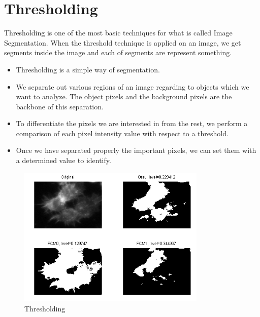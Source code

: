 \section{Thresholding}
Thresholding is one of the most basic techniques for what is called Image Segmentation. When the threshold technique is applied on an image, we get segments inside the image and each of segments are represent something.
\begin{itemize}
\item Thresholding is a simple way of segmentation.
\item We separate out various regions of an image regarding to objects which we want to analyze. The object pixels and the background pixels are the backbone of this separation.
\item To differentiate the pixels we are interested in from the rest, we perform a comparison of each pixel intensity value with respect to a threshold.
\item Once we have separated properly the important pixels, we can set them with a determined value to identify.
\end{itemize}

\begin{figure}[H]
\centering
\label{fig:Thresholding} \includegraphics[width=0.8\textwidth]{Thresholding}
\caption {Thresholding}
\end{figure}


